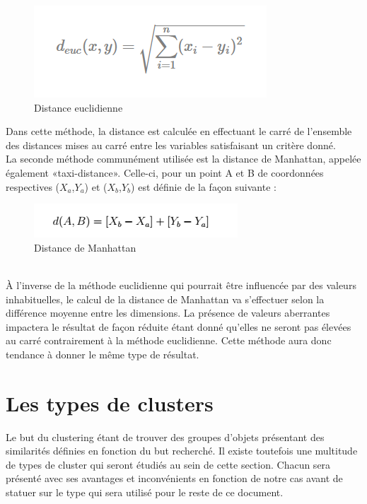 \documentclass[memoire.tex]{subfiles}
\begin{document}
	\begin{figure}[h!]
		\centerline{\includegraphics[scale=0.8]{img/euclidienne_distance.png}}
		\caption{Distance euclidienne}
	\end{figure}
Dans cette méthode, la distance est calculée en effectuant le carré de l'ensemble des distances mises au carré entre les variables satisfaisant un critère donné.\\
La seconde méthode communément utilisée est la distance de Manhattan, appelée également «taxi-distance». Celle-ci, pour un point A et B de coordonnées respectives ($X_{a}$,$Y_{a}$) et ($X_{b}$,$Y_{b}$) est définie de la façon  suivante :\\
	\begin{figure}[h!]
		\centerline{\includegraphics[scale=0.8]{img/manhatan_distance.png}}
		\caption{Distance de Manhattan}
	\end{figure}\\
À l'inverse de la méthode euclidienne qui pourrait être influencée par des valeurs inhabituelles, le calcul de la distance de Manhattan va s'effectuer selon la différence moyenne entre les dimensions. La présence de valeurs aberrantes impactera le résultat de façon réduite étant donné qu'elles ne seront pas élevées au carré contrairement à la méthode euclidienne. Cette méthode aura donc tendance à donner le même type de résultat.
\newpage


\section{Les types de clusters}

Le but du clustering étant de trouver des groupes d'objets présentant des similarités
définies en fonction du but recherché. Il existe toutefois une multitude de types de cluster qui seront étudiés au sein de cette section. Chacun sera présenté avec ses avantages et inconvénients en fonction de notre cas avant de statuer sur le type qui sera utilisé pour le reste de ce document.
\end{document}
